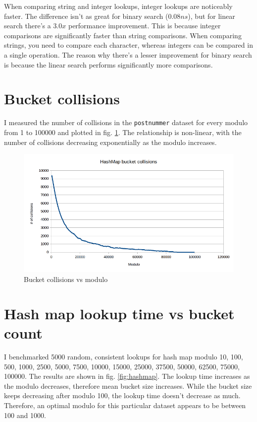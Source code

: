 \documentclass[a4paper,11pt]{article}
\begin{document}
    When comparing string and integer lookups, integer lookups are noticeably faster. The difference isn't as great for binary search ($0.08ns$), but for linear search there's a $3.0x$ performance improvement. This is because integer comparisons are significantly faster than string comparisons. When comparing strings, you need to compare each character, whereas integers can be compared in a single operation. The reason why there's a lesser improvement for binary search is because the linear search performs significantly more comparisons.

    \section*{Bucket collisions}

    I measured the number of collisions in the \texttt{postnummer} dataset for every modulo from 1 to 100000 and plotted in fig. \ref{fig:collisions}. The relationship is non-linear, with the number of collisions decreasing exponentially as the modulo increases.

    \begin{figure}[H]
        \centering
        \includegraphics[width=\textwidth]{collisions.png}
        \caption{Bucket collisions vs modulo}
        \label{fig:collisions}
    \end{figure}

    \section*{Hash map lookup time vs bucket count}

    I benchmarked 5000 random, consistent lookups for hash map modulo 10, 100, 500, 1000, 2500, 5000, 7500, 10000, 15000, 25000, 37500, 50000, 62500, 75000, 100000. The results are shown in fig. \ref{fig:hashmap}. The lookup time increases as the modulo decreases, therefore mean bucket size increases. While the bucket size keeps decreasing after modulo 100, the lookup time doesn't decrease as much. Therefore, an optimal modulo for this particular dataset appears to be between 100 and 1000.
\end{document}
